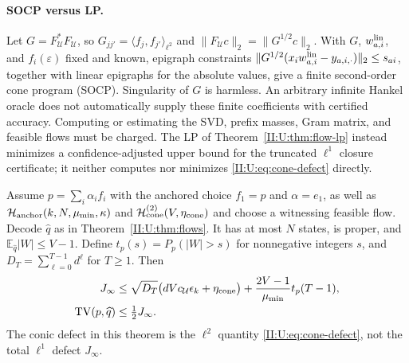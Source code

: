 \paragraph{SOCP versus LP.}
Let $G=F_{\mathcal U}^*F_{\mathcal U}$, so
$G_{jj'}=\langle f_j,f_{j'}\rangle_{\ell^2}$ and
$\|F_{\mathcal U}c\|_2=\|G^{1/2}c\|_2$.
With $G$, $w_{a,i}^{\rm lin}$, and $f_i(\varepsilon)$ fixed and
known, epigraph constraints
$\|G^{1/2}(x_iw_{a,i}^{\rm lin}-y_{a,i,\cdot})\|_2\le s_{ai}$,
together with linear epigraphs for the absolute values, give a finite
second-order cone program (SOCP). Singularity of $G$ is harmless.
An arbitrary infinite Hankel oracle does not automatically supply these
finite coefficients with certified accuracy. Computing or estimating the
SVD, prefix masses, Gram matrix, and feasible flows must be charged.
The LP of Theorem~\ref{II:U:thm:flow-lp} instead minimizes a confidence-adjusted
upper bound for the truncated $\ell^1$ closure certificate; it neither
computes nor minimizes \eqref{II:U:eq:cone-defect} directly.

\begin{theorem}
\label{II:U:thm:conditional-cone-bridge}
Assume $p=\sum_i\alpha_i f_i$ with the anchored choice $f_1=p$ and $\alpha=e_1$, as well as $\mathcal H_{\rm anchor}(k,N,\mu_{\min},\kappa)$ and
$\mathcal H_{\rm cone}^{(2)}(V,\eta_{\rm cone})$ and choose a
witnessing feasible flow. Decode $\widehat q$ as in
Theorem~\ref{II:U:thm:flows}. It has at most $N$ states, is proper, and
$\mathbb E_{\widehat q}|W|\le V-1$. Define
$t_p(s)=P_p(|W|>s)$ for nonnegative integers $s$, and
$D_T=\sum_{\ell=0}^{T-1}d^\ell$ for $T\ge1$. Then
\begin{align}
 J_\infty
 &\le\sqrt{D_T}\bigl(dV c_{\mathcal U}\epsilon_k
                        +\eta_{\rm cone}\bigr)
       +\frac{2V-1}{\mu_{\min}}t_p(T-1),
       \label{II:U:eq:conditional-cone-j}\\
 \operatorname{TV}(p,\widehat q)&\le\tfrac12J_\infty.
       \label{II:U:eq:conditional-cone-tv}
\end{align}
The conic defect in this theorem is the $\ell^2$ quantity
\eqref{II:U:eq:cone-defect}, not the total $\ell^1$ defect $J_\infty$.
\end{theorem}


